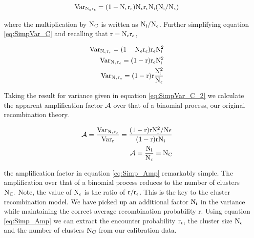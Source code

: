\begin{equation}
\rm Var_{N_\epsilon r_\epsilon} =  (1-N_\epsilon r_\epsilon)N_\epsilon r_\epsilon N_i (N_i/N_\epsilon)
\label{eq:SimpVar_C}
\end{equation}

\noindent where the multiplication by $\rm N_C$ is written as $\rm N_i/N_\epsilon$. Further simplifying equation \ref{eq:SimpVar_C} and recalling that $\rm r=N_\epsilon r_\epsilon$,

\begin{equation}
\begin{split}
\rm Var_{N_\epsilon r_\epsilon} =  (1-N_\epsilon r_\epsilon) r_\epsilon N_i^2 \\
\rm Var_{N_\epsilon r_\epsilon} =  (1-r) r_\epsilon N_i^2 \\
\rm Var_{N_\epsilon r_\epsilon} =  (1-r) r \frac{N_i^2}{N_\epsilon} 
\end{split}
\label{eq:SimpVar_C_2}
\end{equation}

\noindent Taking the result for variance given in equation \ref{eq:SimpVar_C_2} we calculate the apparent amplification factor $\rm \mathcal{A}$ over that of a binomial process, our original recombination theory. 

\begin{equation}
\begin{split}
\rm \mathcal{A} = \frac{Var_{N_\epsilon r_\epsilon}}{Var_{r}} = \frac{(1-r)r N_i^2/N\epsilon}{(1-r)rN_i} \\
\rm \mathcal{A} = \frac{N_i}{N_\epsilon} = N_C
\end{split}
\label{eq:Simp_Amp}
\end{equation}

\noindent the amplification factor in equation \ref{eq:Simp_Amp} remarkably simple. The amplification over that of a binomial process reduces to the number of clusters $\rm N_C$. Note, the value of $\rm N_\epsilon$ is the ratio of $\rm r/r_\epsilon$. This is the key to the cluster recombination model. We have picked up an additional factor $\rm N_i$ in the variance while maintaining the correct average recombination probability r. Using equation \ref{eq:Simp_Amp} we can extract the encounter probability $\rm r_\epsilon$, the cluster size $\rm N_\epsilon$ and the number of clusters $\rm N_C$ from our calibration data.

